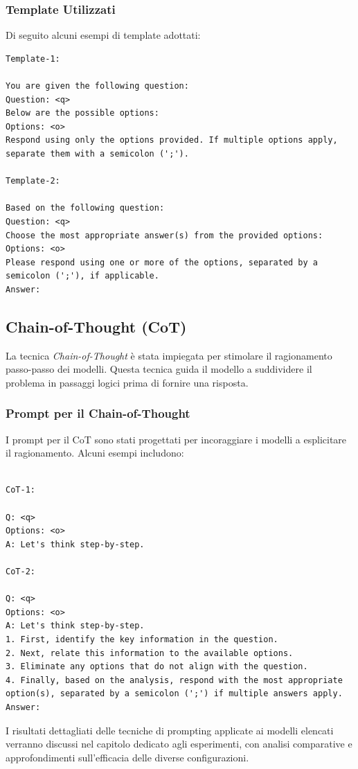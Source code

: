 \documentclass[../main.tex]{subfiles}
\begin{document}
\subsubsection{Template Utilizzati}

Di seguito alcuni esempi di template adottati:
\begin{lstlisting}
Template-1:

You are given the following question:
Question: <q>
Below are the possible options:
Options: <o>
Respond using only the options provided. If multiple options apply, separate them with a semicolon (';').

Template-2:

Based on the following question:  
Question: <q>  
Choose the most appropriate answer(s) from the provided options:  
Options: <o>  
Please respond using one or more of the options, separated by a semicolon (';'), if applicable.  
Answer:  

\end{lstlisting}

\subsection{Chain-of-Thought (CoT)}

La tecnica \textit{Chain-of-Thought} è stata impiegata per stimolare il ragionamento passo-passo dei modelli. Questa tecnica guida il modello a suddividere il problema in passaggi logici prima di fornire una risposta.

\subsubsection{Prompt per il Chain-of-Thought}

I prompt per il CoT sono stati progettati per incoraggiare i modelli a esplicitare il ragionamento. Alcuni esempi includono:

\begin{lstlisting}

CoT-1:

Q: <q>
Options: <o>
A: Let's think step-by-step.  

CoT-2:

Q: <q>  
Options: <o>  
A: Let's think step-by-step.  
1. First, identify the key information in the question.  
2. Next, relate this information to the available options.  
3. Eliminate any options that do not align with the question.  
4. Finally, based on the analysis, respond with the most appropriate option(s), separated by a semicolon (';') if multiple answers apply.  
Answer: 

\end{lstlisting}

I risultati dettagliati delle tecniche di prompting applicate ai modelli elencati verranno discussi nel capitolo dedicato agli esperimenti, con analisi comparative e approfondimenti sull'efficacia delle diverse configurazioni.
\end{document}
